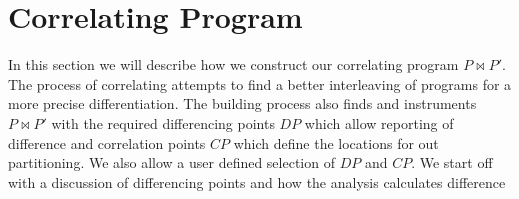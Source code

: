 \section{Correlating Program} 

In this section we will describe how we construct our correlating program $P \bowtie P'$. The process of correlating attempts to find a better interleaving of programs for a more precise differentiation. The building process also finds and instruments $P \bowtie P'$ with the required differencing points $DP$ which allow reporting of difference and correlation points $CP$ which define the locations for out partitioning. We also allow a user defined selection of $DP$ and $CP$. We start off with a discussion of differencing points and how the analysis calculates difference

